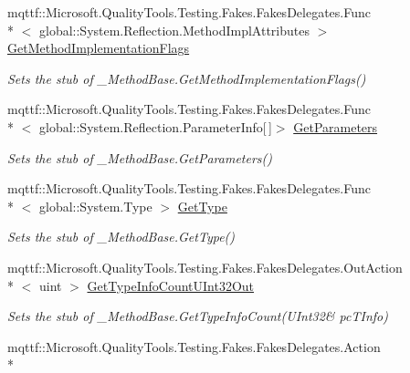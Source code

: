 \begin{DoxyCompactItemize}
mqttf\-::\-Microsoft.\-Quality\-Tools.\-Testing.\-Fakes.\-Fakes\-Delegates.\-Func\\*
$<$ global\-::\-System.\-Reflection.\-Method\-Impl\-Attributes $>$ \hyperlink{class_system_1_1_runtime_1_1_interop_services_1_1_fakes_1_1_stub___method_base_ad3282c977e37a10d4fa21d714c93fa60}{Get\-Method\-Implementation\-Flags}
\begin{DoxyCompactList}\small\item\em Sets the stub of \-\_\-\-Method\-Base.\-Get\-Method\-Implementation\-Flags()\end{DoxyCompactList}\item 
mqttf\-::\-Microsoft.\-Quality\-Tools.\-Testing.\-Fakes.\-Fakes\-Delegates.\-Func\\*
$<$ global\-::\-System.\-Reflection.\-Parameter\-Info\mbox{[}$\,$\mbox{]}$>$ \hyperlink{class_system_1_1_runtime_1_1_interop_services_1_1_fakes_1_1_stub___method_base_a0297426e749e37f408a83e42f8213a64}{Get\-Parameters}
\begin{DoxyCompactList}\small\item\em Sets the stub of \-\_\-\-Method\-Base.\-Get\-Parameters()\end{DoxyCompactList}\item 
mqttf\-::\-Microsoft.\-Quality\-Tools.\-Testing.\-Fakes.\-Fakes\-Delegates.\-Func\\*
$<$ global\-::\-System.\-Type $>$ \hyperlink{class_system_1_1_runtime_1_1_interop_services_1_1_fakes_1_1_stub___method_base_a42351251dc436c3be4b20bc30752885f}{Get\-Type}
\begin{DoxyCompactList}\small\item\em Sets the stub of \-\_\-\-Method\-Base.\-Get\-Type()\end{DoxyCompactList}\item 
mqttf\-::\-Microsoft.\-Quality\-Tools.\-Testing.\-Fakes.\-Fakes\-Delegates.\-Out\-Action\\*
$<$ uint $>$ \hyperlink{class_system_1_1_runtime_1_1_interop_services_1_1_fakes_1_1_stub___method_base_aae6c913185290b33a139fefc67a41801}{Get\-Type\-Info\-Count\-U\-Int32\-Out}
\begin{DoxyCompactList}\small\item\em Sets the stub of \-\_\-\-Method\-Base.\-Get\-Type\-Info\-Count(U\-Int32\& pc\-T\-Info)\end{DoxyCompactList}\item 
mqttf\-::\-Microsoft.\-Quality\-Tools.\-Testing.\-Fakes.\-Fakes\-Delegates.\-Action\\*

\end{DoxyCompactItemize}
